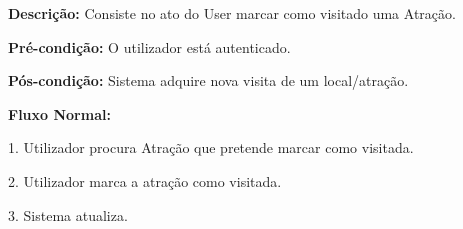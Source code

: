 \textbf{Descrição:}  Consiste no ato do User marcar como visitado uma Atração.

\textbf{Pré-condição:} O utilizador está autenticado.

\textbf{Pós-condição:} Sistema adquire nova visita de um local/atração.

\textbf{Fluxo Normal:}

1. Utilizador procura Atração que pretende marcar como visitada.

2. Utilizador marca a atração como visitada.

3. Sistema atualiza.

    
    
    